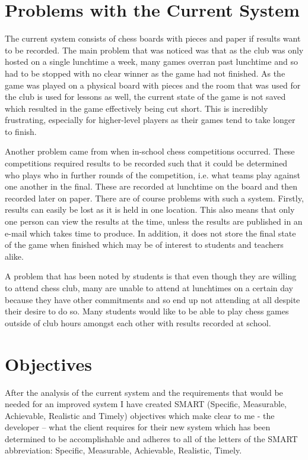\documentclass[]{report}
\begin{document}
\section{Problems with the Current System}
The current system consists of chess boards with pieces and paper if results want to be recorded. The main problem that was noticed was that as the club was only hosted on a single lunchtime a week, many games overran past lunchtime and so had to be stopped with no clear winner as the game had not finished. As the game was played on a physical board with pieces and the room that was used for the club is used for lessons as well, the current state of the game is not saved which resulted in the game effectively being cut short. This is incredibly frustrating, especially for higher-level players as their games tend to take longer to finish. 

Another problem came from when in-school chess competitions occurred. These competitions required results to be recorded such that it could be determined who plays who in further rounds of the competition, i.e. what teams play against one another in the final. These are recorded at lunchtime on the board and then recorded later on paper. There are of course problems with such a system. Firstly, results can easily be lost as it is held in one location. This also means that only one person can view the results at the time, unless the results are published in an e-mail which takes time to produce. In addition, it does not store the final state of the game when finished which may be of interest to students and teachers alike.

A problem that has been noted by students is that even though they are willing to attend chess club, many are unable to attend at lunchtimes on a certain day because they have other commitments and so end up not attending at all despite their desire to do so. Many students would like to be able to play chess games outside of club hours amongst each other with results recorded at school.
\section{Objectives}
After the analysis of the current system and the requirements that would be needed for an improved system I have created SMART (Specific, Measurable, Achievable, Realistic and Timely) objectives which make clear to me - the developer – what the client requires for their new system which has been determined to be accomplishable and adheres to all of the letters of the SMART abbreviation: Specific, Measurable, Achievable, Realistic, Timely.
\end{document}
